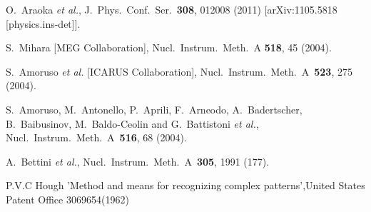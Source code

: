 \documentclass[preprint,12pt]{elsarticle}
\begin{document}









\begin{thebibliography}{00}


  O.~Araoka {\it et al.},
  J.\ Phys.\ Conf.\ Ser.\  {\bf 308}, 012008 (2011)
  [arXiv:1105.5818 [physics.ins-det]].

S.~Mihara [MEG Collaboration],
Nucl.\ Instrum.\ Meth.\ A {\bf 518}, 45 (2004).

  S.~Amoruso {\it et al.} [ICARUS Collaboration],
  Nucl.\ Instrum.\ Meth.\ A\ {\bf 523}, 275  (2004).

  S.~Amoruso, M.~Antonello, P.~Aprili, F.~Arneodo, A.~Badertscher, B.~Baibusinov, M.~Baldo-Ceolin and G.~Battistoni {\it et al.},
  Nucl.\ Instrum.\ Meth.\ A\ {\bf 516}, 68  (2004).

  A.~Bettini {\it et al.}, Nucl.\ Instrum.\ Meth.\ A\ {\bf 305}, 1991  (177).

  P.V.C Hough 'Method and means for recognizing complex patterns',United States Patent Office 3069654(1962) 

\end{thebibliography}
\end{document}
